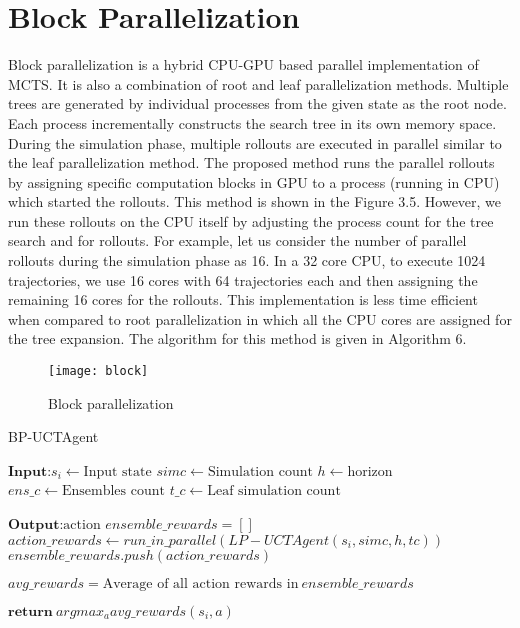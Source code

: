 \documentclass[double,12pt]{beavtex}
\begin{document}
\section{Block Parallelization}
Block parallelization is a hybrid CPU-GPU based parallel implementation of MCTS. It is also a combination of root and leaf parallelization methods. Multiple trees are generated by individual processes from the given state as the root node. Each process incrementally constructs the search tree in its own memory space. During the simulation phase, multiple rollouts are executed in parallel similar to the leaf parallelization method. The proposed method runs the parallel rollouts by assigning specific computation blocks in GPU to a process (running in CPU) which started the rollouts. This method is shown in the Figure 3.5. However, we run these rollouts on the CPU itself by adjusting the process count for the tree search and for rollouts. For example, let us consider the number of parallel rollouts during the simulation phase as 16. In a 32 core CPU, to execute 1024 trajectories, we use 16 cores with 64 trajectories each and then assigning the remaining 16 cores for the rollouts. This implementation is less time efficient when compared to root parallelization in which all the CPU cores are assigned for the tree expansion. The algorithm for this method is given in Algorithm 6.

\begin{figure}[h!]
\centering
\texttt{[image: block]}
\caption{Block parallelization}
\end{figure}

\begin{algorithm}
	\caption{BP-UCTAgent}
	\label{alg:smartmeter}
	\begin{algorithmic}[1]
		\Statex $\textbf{Input:}   s_i \leftarrow \text{Input state}$
		\Statex $simc\leftarrow \text{Simulation count}$ 
		\Statex $h\leftarrow \text{horizon}$
		\Statex $ens\_c\leftarrow \text{Ensembles count}$
		\Statex $t\_c\leftarrow \text{Leaf simulation count}$

		\Statex $\textbf{Output:}  \text{action}$
		\State $ensemble\_rewards = []$
			\State $action\_rewards \leftarrow run\_in\_parallel(LP-UCTAgent(s_i, simc, h, tc))$
			\State $ensemble\_rewards.push(action\_rewards)$
		\EndFor

		\State $avg\_rewards = \text{Average of all action rewards in}~ensemble\_rewards$

		\Statex $\textbf{return}~argmax_aavg\_rewards(s_i,a)$
	\end{algorithmic}
\end{algorithm}
\end{document}
